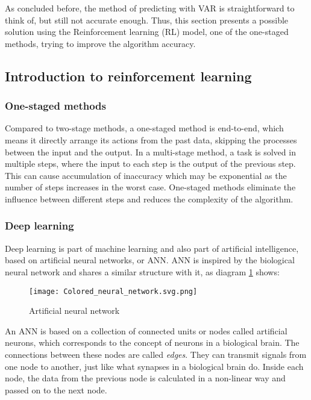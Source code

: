 \documentclass{mcmthesis}
\begin{document}
As concluded before,
the method of predicting with VAR is straightforward to think of,
but still not accurate enough.
Thus, this section presents a possible solution using the Reinforcement learning (RL) model, one of the one-staged methods,
trying to improve the algorithm accuracy.

\subsection{Introduction to reinforcement learning}

\subsubsection{One-staged methods}

Compared to two-stage methods, a one-staged method is end-to-end, which means it directly arrange its actions from the past data, skipping the processes between the input and the output\cite{lecun2004autonomous}.
In a multi-stage method, a task is solved in multiple steps, where the input to each step is the output of the previous step.
This can cause accumulation of inaccuracy which may be exponential as the number of steps increases in the worst case.
One-staged methods eliminate the influence between different steps and reduces the complexity of the algorithm.

\subsubsection{Deep learning}

Deep learning is part of machine learning and also part of artificial intelligence,
based on artificial neural networks, or ANN.
ANN is inspired by the biological neural network
and shares a similar structure with it, as diagram \ref{ANN} shows:

\begin{figure}[h]
\small
\centering
\texttt{[image: Colored\_neural\_network.svg.png]}
\caption{Artificial neural network} \label{ANN}
\end{figure}

An ANN is based on a collection of connected units or nodes called artificial neurons,
which corresponds to the concept of neurons in a biological brain.
The connections between these nodes are called \textit{edges}.
They can transmit signals from one node to another,
just like what synapses in a biological brain do.
Inside each node, the data from the previous node is calculated in a non-linear way
and passed on to the next node.
\end{document}
